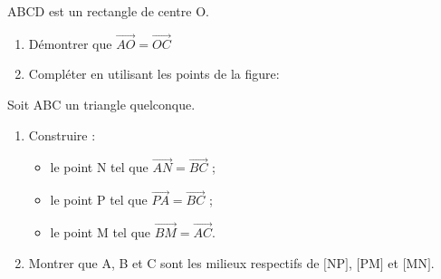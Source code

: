 \begin{exercice}
ABCD est un rectangle de centre O.
\begin{enumerate}
\item Démontrer que $\overrightarrow{AO}=\overrightarrow{OC}$
\item Compléter en utilisant les points de la figure:
\end{enumerate}
\end{exercice}


\begin{exercice}
Soit ABC un triangle quelconque.

\begin{enumerate}
\item Construire :

\begin{itemize}
\item le point N tel que $\overrightarrow{AN}=\overrightarrow{BC}$ ;
\item le point P tel que $\overrightarrow{PA}=\overrightarrow{BC}$ ;
\item le point M tel que $\overrightarrow{BM}=\overrightarrow{AC}$.
\end{itemize}

\item Montrer que A, B et C sont les milieux respectifs de $[$NP$]$, $[$PM$]$ et $[$MN$]$.

\end{enumerate}
\end{exercice}

